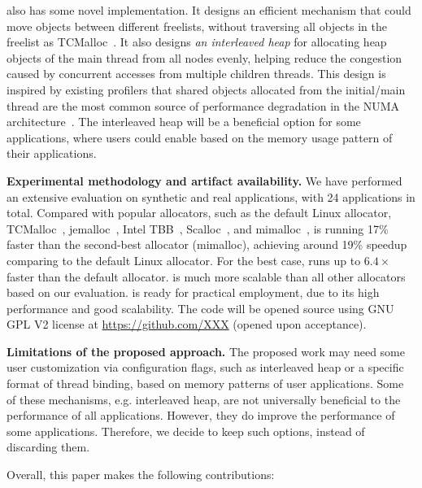 \NM{} also has some novel implementation. It designs an efficient mechanism that could move objects between different freelists, without traversing all objects in the freelist as TCMalloc~\cite{tcmalloc}. It also designs \textit{an interleaved heap} for allocating heap objects of the main thread from all nodes evenly, helping reduce the congestion caused by concurrent accesses from multiple children threads. This design is inspired by existing profilers that shared objects allocated from the initial/main thread are the most common source of performance degradation in the NUMA architecture~\cite{XuNuma, MemProf}. The interleaved heap will be a beneficial option for some applications, where users could enable based on the memory usage pattern of their applications. 

\textbf{Experimental methodology and artifact availability.} We have performed an extensive evaluation on synthetic and real applications, with 24 applications in total. Compared \NM{} with popular allocators, such as the default Linux allocator, TCMalloc~\cite{tcmalloc}, jemalloc~\cite{jemalloc}, Intel TBB~\cite{tbb}, Scalloc~\cite{Scalloc}, and mimalloc~\cite{mimalloc},  \NM{} is running 17\% faster than the second-best allocator (mimalloc), achieving around 19\% speedup comparing to the default Linux allocator. For the best case, \NM{} runs up to $6.4\times$ faster than the default allocator. \NM{} is much more scalable than all other allocators based on our evaluation. \NM{} is ready for practical employment, due to its high performance and good scalability. The code will be opened source using GNU GPL V2 license at \url{https://github.com/XXX} (opened upon acceptance). 

\textbf{Limitations of the proposed approach.} The proposed work may need some user customization via configuration flags, such as interleaved heap or a specific format of thread binding, based on memory patterns of user applications. Some of these mechanisms, e.g. interleaved heap, are not universally beneficial to the performance of all applications. However, they do improve the performance of some applications. Therefore, we decide to keep such options, instead of discarding them. 

Overall, this paper makes the following contributions:

